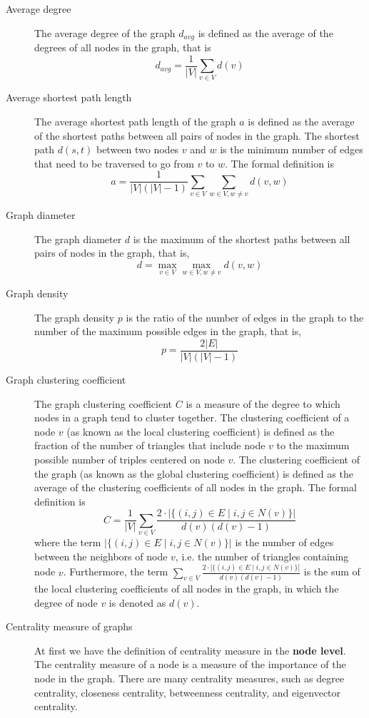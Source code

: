 \begin{description}
    \item [Average degree] The average degree of the graph $d_{avg}$ is defined as the average of the degrees of all nodes in the graph, that is
    $$ d_{avg} = \frac{1}{|V|} \sum_{v \in V} d(v)$$
    \item [Average shortest path length] The average shortest path length of the graph $a$ is defined as the average of the shortest paths between all pairs of nodes in the graph. The shortest path $d(s, t)$ between two nodes $v$ and $w$ is the minimum number of edges that need to be traversed to go from $v$ to $w$. The formal definition is
    $$
a = \frac{1}{|V|(|V|-1)} \sum_{v \in V} \sum_{w \in V, w \neq v} d(v, w)
    $$

    \item [Graph diameter] The graph diameter $d$ is the maximum of the shortest paths between all pairs of nodes in the graph, that is,
    $$
d = \max_{v \in V} \max_{w \in V, w \neq v} d(v, w)
    $$

    \item [Graph density] The graph density $p$ is the ratio of the number of edges in the graph to the number of the maximum possible edges in the graph, that is,
    $$
p = \frac{2|E|}{|V|(|V|-1)}
    $$
    
    \item [Graph clustering coefficient] The graph clustering coefficient $C$ is a measure of the degree to which nodes in a graph tend to cluster together. The clustering coefficient of a node $v$ (as known as the local clustering coefficient) is defined as the fraction of the number of triangles that include node $v$ to the maximum possible number of triples centered on node $v$. The clustering coefficient of the graph (as known as the global clustering coefficient) is defined as the average of the clustering coefficients of all nodes in the graph. The formal definition is
    $$
C = \frac{1}{|V|} \sum_{v \in V} \frac{2\cdot |\{(i,j)\in E \mid i, j \in N(v)\}|}{d(v)(d(v)-1)}
    $$
    where the term $|\{(i,j)\in E \mid i, j \in N(v)\}|$ is the number of edges between the neighbors of node $v$, i.e. the number of triangles containing node $v$. Furthermore, the term $\sum_{v \in V} \frac{2\cdot |\{(i,j)\in E \mid i, j \in N(v)\}|}{d(v)(d(v)-1)}$ is the sum of the local clustering coefficients of all nodes in the graph, in which the degree of node $v$ is denoted as $d(v)$.

    \item [Centrality measure of graphs] At first we have the definition of centrality measure in the \textbf{node level}. The centrality measure of a node is a measure of the importance of the node in the graph. There are many centrality measures, such as degree centrality, closeness centrality, betweenness centrality, and eigenvector centrality. 
    

\end{description}
